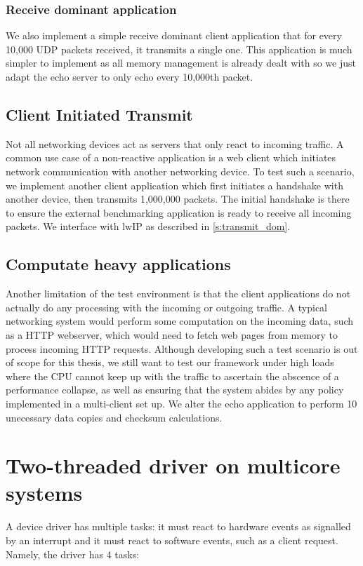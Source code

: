 \subsubsection{Receive dominant application}
We also implement a simple receive dominant client application that for every 10,000 UDP packets received, it transmits a single one.
This application is much simpler to implement as all memory management is already dealt with so we just adapt the echo server to 
only echo every 10,000th packet.\\

\subsection{Client Initiated Transmit}
Not all networking devices act as servers that only react to incoming traffic. A common use case of a non-reactive application is a 
web client which initiates network communication with another networking device. To test such a scenario, we implement another client
application which first initiates a handshake with another device, then transmits 1,000,000 packets. The initial handshake is there to 
ensure the external benchmarking application is ready to receive all incoming packets. We interface with lwIP as described
in \autoref{s:transmit_dom}.

\subsection{Computate heavy applications}\label{s:compute_heavy}
Another limitation of the test environment is that the client applications do not actually do any processing with the incoming or outgoing traffic.
A typical networking system would perform some computation on the incoming data, such as a HTTP webserver, which would need to fetch web pages from
memory to process incoming HTTP requests. Although developing such a test scenario is out of scope for this thesis, we still want to test
our framework under high loads where the CPU cannot keep up with the traffic to ascertain the abscence of a performance collapse, as well as
ensuring that the system abides by any policy implemented in a multi-client set up. We alter the echo application to perform 10 unecessary data copies
and checksum calculations.

\section{Two-threaded driver on multicore systems}
A device driver has multiple tasks: it must react to hardware events as signalled by an interrupt and it must react to software events,
such as a client request. Namely, the driver has 4 tasks:

